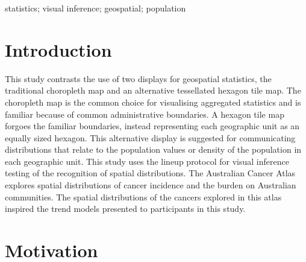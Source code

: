 \documentclass[conference,final,]{IEEEtran}
\begin{document}
\begin{IEEEkeywords}
statistics; visual inference; geospatial; population
\end{IEEEkeywords}




\maketitle


%
\IEEEpeerreviewmaketitle


\hypertarget{introduction}{%
\section{Introduction}\label{introduction}}

This study contrasts the use of two displays for geospatial statistics, the traditional choropleth map and an alternative tessellated hexagon tile map. The choropleth map is the common choice for visualising aggregated statistics and is familiar because of common administrative boundaries.
A hexagon tile map forgoes the familiar boundaries, instead representing each geographic unit as an equally sized hexagon. This alternative display is suggested for communicating distributions that relate to the population values or density of the population in each geographic unit. This study uses the lineup protocol for visual inference testing of the recognition of spatial distributions. The Australian Cancer Atlas explores spatial distributions of cancer incidence and the burden on Australian communities. The spatial distributions of the cancers explored in this atlas inspired the trend models presented to participants in this study.

\hypertarget{motivation}{%
\section{Motivation}\label{motivation}}
\end{document}
